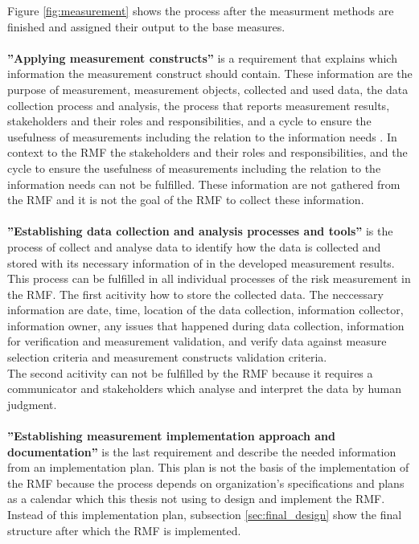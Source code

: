 Figure \ref{fig:measurement} shows the process after the measurment methods are finished and assigned their output to the base measures. \\ \\

\textbf{''Applying measurement constructs''} is a requirement that explains which information the measurement construct should contain. These information are the purpose of measurement, measurement objects, collected and used data, the data collection process and analysis, the process that reports measurement results, stakeholders and their roles and responsibilities, and a cycle to ensure the usefulness of measurements including the relation to the information needs \cite{ISO_27004_2009}. In context to the RMF the stakeholders and their roles and responsibilities, and the cycle to ensure the usefulness of measurements including the relation to the information needs can not be fulfilled. These information are not gathered from the RMF and it is not the goal of the RMF to collect these information. \\ \\

\textbf{''Establishing data collection and analysis processes and tools''} is the process of collect and analyse data to identify how the data is collected and stored with its necessary information of in the developed measurement results. This process can be fulfilled in all individual processes of the risk measurement in the RMF. The first acitivity how to store the collected data. The neccessary information are date, time, location of the data collection, information collector, information owner, any issues that happened during data collection, information for verification and measurement validation, and verify data against measure selection criteria and measurement constructs validation criteria. \\ The second acitivity can not be fulfilled by the RMF because it requires a communicator and stakeholders which analyse and interpret the data by human judgment. \\ \\

\textbf{''Establishing measurement implementation approach and documentation''} is the last requirement and describe the needed information from an implementation plan. This plan is not the basis of the implementation of the RMF because the process depends on organization's specifications and plans as a calendar which this thesis not using to design and implement the RMF. Instead of this implementation plan, subsection \ref{sec:final_design} show the final structure after which the RMF is implemented. \\ \\

